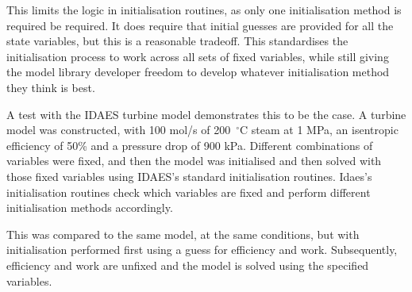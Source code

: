 This limits the logic in initialisation routines, as only one
initialisation method is required be required. It does require that
initial guesses are provided for all the state variables, but this is a
reasonable tradeoff. This standardises the initialisation process to
work across all sets of fixed variables, while still giving the model
library developer freedom to develop whatever initialisation method they
think is best.

A test with the IDAES turbine model demonstrates this to be the case. A
turbine model was constructed, with 100 mol/s of 200~$^\circ$C steam at 1 MPa, an
isentropic efficiency of 50\% and a pressure drop of 900 kPa. Different
combinations of variables were fixed, and then the model was initialised
and then solved with those fixed variables using IDAES's standard
initialisation routines. Idaes's initialisation routines check which
variables are fixed and perform different initialisation methods
accordingly.

This was compared to the same model, at the same conditions, but with
initialisation performed first using a guess for efficiency and work.
Subsequently, efficiency and work are unfixed and the model is solved
using the specified variables.

